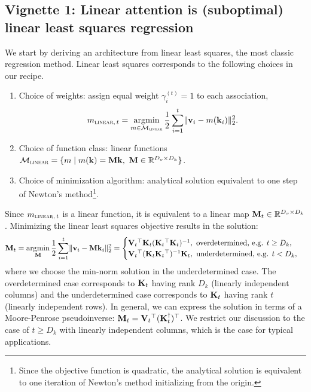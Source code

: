 \documentclass[notitlepage, 11pt]{article}
\newcommand*{\memory}{{m}}
\newcommand*{\dkey}{{D_k}}
\newcommand*{\dval}{{D_v}}
\newcommand*{\linearfunctions}{{\Mcal_{\textsc{linear}}}}
\begin{document}
\subsection*{Vignette 1: Linear attention is (suboptimal) linear least squares regression}
We start by deriving an architecture from linear least squares, the most classic regression method.
Linear least squares corresponds to the following choices in our recipe.
\begin{enumerate}
    \item Choice of weights: assign equal weight $\gamma_i^{(t)} = 1$ to each association,  \begin{align}\memory_{\textsc{linear},\,t} = \argmin_{\memory\in \linearfunctions} \frac{1}{2}\sum_{i=1}^t \norm{\vbf_i - \memory(\kbf_i)}_2^2.\label{eqn:linear-least-squares}\end{align}
    \item Choice of function class: linear functions $\linearfunctions = \{\memory\mid \memory(\kbf) = \Mbf \kbf,\ \Mbf \in \reals^{\dval\times\dkey}\}$.
    \item Choice of minimization algorithm: analytical solution equivalent to one step of Newton's method\footnote{Since the objective function is quadratic, the analytical solution is equivalent to one iteration of Newton's method initializing from the origin.}.
\end{enumerate}
Since $\memory_{\textsc{linear},\,t}$ is a linear function, it is equivalent to a linear map $\Mbf_t\in \reals^{\dval\times\dkey}$.
Minimizing the linear least squares objective results in the solution:
\begin{align}
\Mbf_t = \argmin_{\Mbf} \frac{1}{2}\sum_{i=1}^t \norm{\vbf_i - \Mbf\kbf_i}_2^2
    =\begin{cases}
        \Vbf_t\transpose \Kbf_t(\Kbf_t\transpose\Kbf_t)\inverse, \ \text{overdetermined, e.g. } t \geq \dkey, \label{eqn:ols}\\%
        \Vbf_t\transpose (\Kbf_t\Kbf_t\transpose)\inverse\Kbf_t, \ \text{underdetermined, e.g. } t < \dkey, 
    \end{cases}
\end{align}
where we choose the min-norm solution in the underdetermined case.
The overdetermined case corresponds to $\mathbf{K}_t$ having rank $\dkey$ (linearly independent columns) and the underdetermined case corresponds to $\mathbf{K}_t$ having rank $t$ (linearly independent rows).
In general, we can express the solution in terms of a Moore-Penrose pseudoinverse: $\mathbf{M}_t = \mathbf{V}_t{}^\top(\mathbf{K}_t^{\dagger}){}^\top$.
We restrict our discussion to the case of $t \geq \dkey$ with linearly independent columns, which is the case for typical applications.
\end{document}
